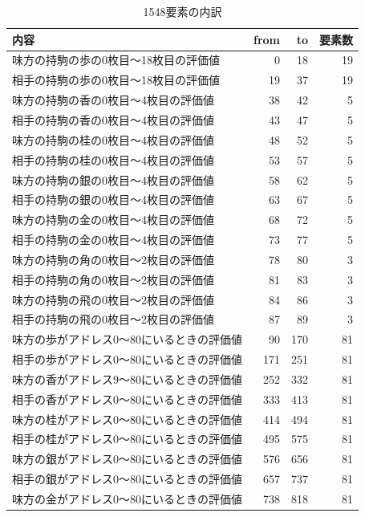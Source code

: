 \documentclass[11pt,a4paper]{ltjsarticle}
\begin{document}
\begin{table}[h]
  \centering
  \caption{1548要素の内訳}
  \small
  \begin{tabular}{lrrr}
    内容 & from & to & 要素数 \\ \hline
    味方の持駒の歩の0枚目～18枚目の評価値 &  0 & 18 & 19 \\
    相手の持駒の歩の0枚目～18枚目の評価値 & 19 & 37 & 19 \\
    味方の持駒の香の0枚目～4枚目の評価値  & 38 & 42 &  5 \\
    相手の持駒の香の0枚目～4枚目の評価値  & 43 & 47 &  5 \\
    味方の持駒の桂の0枚目～4枚目の評価値  & 48 & 52 &  5 \\
    相手の持駒の桂の0枚目～4枚目の評価値  & 53 & 57 &  5 \\
    味方の持駒の銀の0枚目～4枚目の評価値  & 58 & 62 &  5 \\
    相手の持駒の銀の0枚目～4枚目の評価値  & 63 & 67 &  5 \\
    味方の持駒の金の0枚目～4枚目の評価値  & 68 & 72 &  5 \\
    相手の持駒の金の0枚目～4枚目の評価値  & 73 & 77 &  5 \\
    味方の持駒の角の0枚目～2枚目の評価値  & 78 & 80 &  3 \\
    相手の持駒の角の0枚目～2枚目の評価値  & 81 & 83 &  3 \\
    味方の持駒の飛の0枚目～2枚目の評価値  & 84 & 86 &  3 \\
    相手の持駒の飛の0枚目～2枚目の評価値  & 87 & 89 &  3 \\
    味方の歩がアドレス0～80にいるときの評価値 &   90 &  170 & 81 \\
    相手の歩がアドレス0～80にいるときの評価値 &  171 &  251 & 81 \\
    味方の香がアドレス9～80にいるときの評価値 &  252 &  332 & 81 \\
    相手の香がアドレス0～80にいるときの評価値 &  333 &  413 & 81 \\
    味方の桂がアドレス0～80にいるときの評価値 &  414 &  494 & 81 \\
    相手の桂がアドレス0～80にいるときの評価値 &  495 &  575 & 81 \\
    味方の銀がアドレス0～80にいるときの評価値 &  576 &  656 & 81 \\
    相手の銀がアドレス0～80にいるときの評価値 &  657 &  737 & 81 \\
    味方の金がアドレス0～80にいるときの評価値 &  738 &  818 & 81 \\

\end{tabular}
\end{table}
\end{document}
